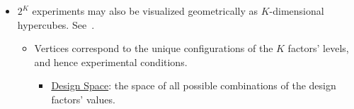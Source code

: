 \begin{itemize}[$\rightarrow$]
    \item $ 2^K $ experiments may also be visualized geometrically as $ K $-dimensional hypercubes. See~.
          \begin{itemize}
              \item Vertices correspond to the unique configurations of the $ K $ factors' levels,
                    and hence experimental conditions.
                    \begin{itemize}[label={}]
                        \item \underline{Design Space}: the space of all possible combinations of the design factors' values.
                    \end{itemize}
          \end{itemize}
\end{itemize}

